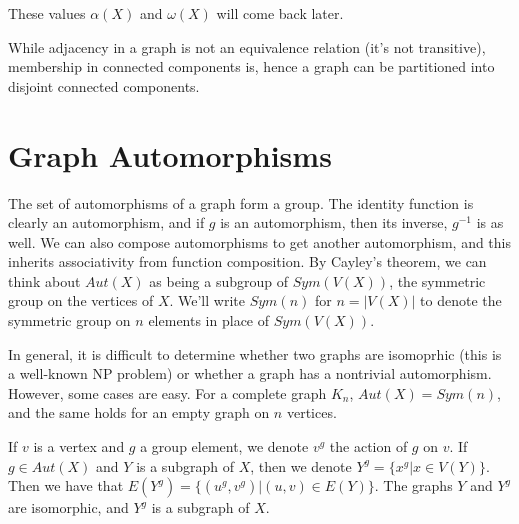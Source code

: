 

These values $\alpha(X)$ and $\omega(X)$ will come back later.


While adjacency in a graph is not an equivalence relation (it's not transitive), membership in connected components is, hence a graph can be partitioned into disjoint connected components.

\section*{Graph Automorphisms}



The set of automorphisms of a graph form a group. The identity function is clearly an automorphism, and if $g$ is an automorphism, then its inverse, $g^{-1}$ is as well.  We can also compose automorphisms to get another automorphism, and this inherits associativity from function composition.  By Cayley's theorem, we can think about $Aut(X)$ as being a subgroup of $Sym(V(X))$, the symmetric group on the vertices of $X$. We'll write $Sym(n)$ for $n=|V(X)|$ to denote the symmetric group on $n$ elements in place of $Sym(V(X))$. 

In general, it is difficult to determine whether two graphs are isomoprhic (this is a well-known NP problem) or whether a graph has a nontrivial automorphism.  However, some cases are easy.  For a complete graph $K_n$, $Aut(X)=Sym(n)$, and the same holds for an empty graph on $n$ vertices.

If $v$ is a vertex and $g$ a group element, we denote $v^g$ the action of $g$ on $v$.  If $g\in Aut(X)$ and $Y$ is a subgraph of $X$, then we denote $Y^g = \{x^g|x\in V(Y)\}$.  Then we have that $E(Y^g) = \{(u^g,v^g)|(u,v)\in E(Y)\}$.  The graphs $Y$ and $Y^g$ are isomorphic, and $Y^g$ is a subgraph of $X$.

